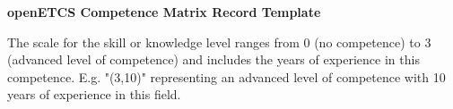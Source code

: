 \documentclass[a4paper, 11pt]{article}
\newcommand{\ra}[1]{\renewcommand{\arraystretch}{#1}}
\begin{document}
\begin{center} \huge\bf openETCS Competence Matrix Record Template\end{center}

\vspace{1\baselineskip}\vspace{-\parskip}

\begin{center}

The scale for the skill or knowledge level ranges from 0 (no competence) to 3 (advanced level of competence) and includes the years of experience in this competence. 
E.g. "(3,10)" representing an advanced level of competence with 10 years of experience in this field.


     \begin{longtable}{|r|r|r|r|r|r|r|r|}


\end{longtable}
\end{center}
\end{document}
